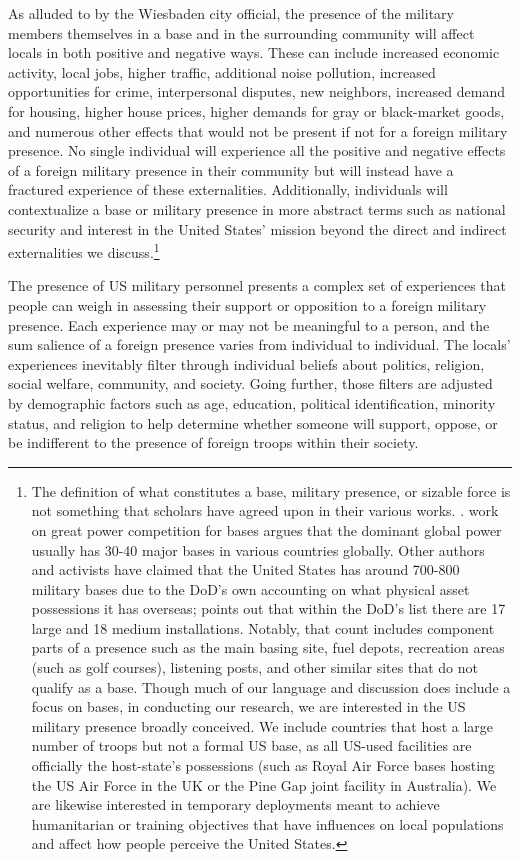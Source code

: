 {As alluded to by the Wiesbaden city official, the presence of the military members themselves in a base and in the surrounding community will affect locals in both positive and negative ways. These can include increased economic activity, local jobs, higher traffic, additional noise pollution, increased opportunities for crime, interpersonal disputes, new neighbors, increased demand for housing, higher house prices, higher demands for gray or black-market goods, and numerous other effects that would not be present if not for a foreign military presence. No single individual will experience all the positive and negative effects of a foreign military presence in their community but will instead have a fractured experience of these externalities. Additionally, individuals will contextualize a base or military presence in more abstract terms such as national security and interest in the United States' mission beyond the direct and indirect externalities we discuss.\footnote{The definition of what constitutes a base, military presence, or sizable force is not something that scholars have agreed upon in their various works. \cite{Gillem2007}.  work on great power competition for bases argues that the dominant global power usually has 30-40 major bases in various countries globally. Other authors and activists have claimed that the United States has around 700-800 military bases due to the DoD's own accounting on what physical asset possessions it has overseas;  points out that within the DoD's list there are 17 large and 18 medium installations. Notably, that count includes component parts of a presence such as the main basing site, fuel depots, recreation areas (such as golf courses), listening posts, and other similar sites that do not qualify as a base. Though much of our language and discussion does include a focus on bases, in conducting our research, we are interested in the US military presence broadly conceived. We include countries that host a large number of troops but not a formal US base, as all US-used facilities are officially the host-state's possessions (such as Royal Air Force bases hosting the US Air Force in the UK or the Pine Gap joint facility in Australia). We are likewise interested in temporary deployments meant to achieve humanitarian or training objectives that have influences on local populations and affect how people perceive the United States.} 
	
	The presence of US military personnel presents a complex set of experiences that people can weigh in assessing their support or opposition to a foreign military presence. Each experience may or may not be meaningful to a person, and the sum salience of a foreign presence varies from individual to individual. The locals' experiences inevitably filter through individual beliefs about politics, religion, social welfare, community, and society. Going further, those filters are adjusted by demographic factors such as age, education, political identification, minority status, and religion to help determine whether someone will support, oppose, or be indifferent to the presence of foreign troops within their society. 
	
}
